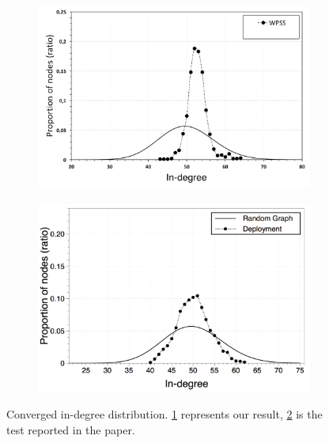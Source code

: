 \begin{figure}
\centering
\begin{subfigure}{.5\textwidth}
  \centering
  \includegraphics[keepaspectratio=true, width=1\linewidth]{images/converged_indegree}
  \caption{}
  \label{fig:converged_indegree}
\end{subfigure}%
\begin{subfigure}{.5\textwidth}
  \centering
  \includegraphics[keepaspectratio=true, width=1\linewidth]{images/paper_converged_indegree}
  \caption{}
  \label{fig:paper_converged_indegree}
\end{subfigure}
\caption{Converged in-degree distribution. \ref{fig:converged_indegree} represents our result, \ref{fig:paper_converged_indegree} is the test reported in the paper.}
\label{fig:randomness_conv_indegree}
\end{figure}

